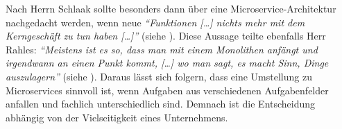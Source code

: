 Nach Herrn Schlaak sollte besonders dann über eine Microservice-Architektur nachgedacht werden, wenn neue \textit{\enquote{Funktionen […] nichts mehr mit dem Kerngeschäft zu tun haben […]}} (siehe ). Diese Aussage teilte ebenfalls Herr Rahles: \textit{\enquote{Meistens ist es so, dass man mit einem Monolithen anfängt und irgendwann an einen Punkt kommt, […] wo man sagt, es macht Sinn, Dinge auszulagern}} (siehe ). Daraus lässt sich folgern, dass eine Umstellung zu Microservices sinnvoll ist, wenn Aufgaben aus verschiedenen Aufgabenfelder anfallen und fachlich unterschiedlich sind. Demnach ist die Entscheidung abhängig von der Vielseitigkeit eines Unternehmens.